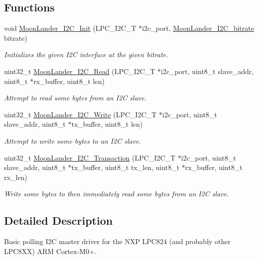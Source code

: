 \subsection*{Functions}
\begin{DoxyCompactItemize}
\item 
void \hyperlink{MoonLander-i2c_8h_aa8b0b475cb2a4860cb5d6c4a13895129}{Moon\+Lander\+\_\+\+I2\+C\+\_\+\+Init} (L\+P\+C\+\_\+\+I2\+C\+\_\+T $\ast$i2c\+\_\+port, \hyperlink{MoonLander-i2c_8h_a99b692076d07b714e6b130bdc715e3ee}{Moon\+Lander\+\_\+\+I2\+C\+\_\+bitrate} bitrate)
\begin{DoxyCompactList}\small\item\em Initializes the given I2C interface at the given bitrate. \end{DoxyCompactList}\item 
uint32\+\_\+t \hyperlink{MoonLander-i2c_8h_a198617ba51109894385bb0ee640fce3d}{Moon\+Lander\+\_\+\+I2\+C\+\_\+\+Read} (L\+P\+C\+\_\+\+I2\+C\+\_\+T $\ast$i2c\+\_\+port, uint8\+\_\+t slave\+\_\+addr, uint8\+\_\+t $\ast$rx\+\_\+buffer, uint8\+\_\+t len)
\begin{DoxyCompactList}\small\item\em Attempt to read some bytes from an I2C slave. \end{DoxyCompactList}\item 
uint32\+\_\+t \hyperlink{MoonLander-i2c_8h_afc446bc861639e8c9fb073cad69f34d1}{Moon\+Lander\+\_\+\+I2\+C\+\_\+\+Write} (L\+P\+C\+\_\+\+I2\+C\+\_\+T $\ast$i2c\+\_\+port, uint8\+\_\+t slave\+\_\+addr, uint8\+\_\+t $\ast$tx\+\_\+buffer, uint8\+\_\+t len)
\begin{DoxyCompactList}\small\item\em Attempt to write some bytes to an I2C slave. \end{DoxyCompactList}\item 
uint32\+\_\+t \hyperlink{MoonLander-i2c_8h_aa736d66b137e59b64d8b1b1a85c4cd8b}{Moon\+Lander\+\_\+\+I2\+C\+\_\+\+Transaction} (L\+P\+C\+\_\+\+I2\+C\+\_\+T $\ast$i2c\+\_\+port, uint8\+\_\+t slave\+\_\+addr, uint8\+\_\+t $\ast$tx\+\_\+buffer, uint8\+\_\+t tx\+\_\+len, uint8\+\_\+t $\ast$rx\+\_\+buffer, uint8\+\_\+t rx\+\_\+len)
\begin{DoxyCompactList}\small\item\em Write some bytes to then immediately read some bytes from an I2C slave. \end{DoxyCompactList}\end{DoxyCompactItemize}


\subsection{Detailed Description}
Basic polling I2C master driver for the N\+XP L\+P\+C824 (and probably other L\+P\+C8\+XX) A\+RM Cortex-\/\+M0+. 

